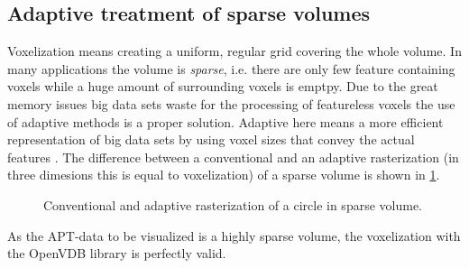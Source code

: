 \subsection{Adaptive treatment of sparse volumes}
\label{sparse volumes}

Voxelization means creating a uniform, regular grid covering the whole volume. In many applications the volume is \emph{sparse}, i.e. there are only few feature containing voxels while a huge amount of surrounding voxels is emptpy.
Due to the great memory issues big data sets waste for the processing of featureless voxels the use of adaptive methods is a proper solution.
Adaptive here means a more efficient representation of big data sets  by using voxel sizes that convey the actual features \cite{OpenVDB}. The difference between a conventional and an adaptive rasterization (in three dimesions this is equal to voxelization) of a sparse volume is shown in \cref{fig:conv_vs_adapt}.

\begin{figure}[H]%
	\centering
	\caption{Conventional and adaptive rasterization of a circle in sparse volume.\label{fig:conv_vs_adapt}}%
\end{figure}

As the APT-data to be visualized is a highly sparse volume, the voxelization with the OpenVDB library is perfectly valid. 